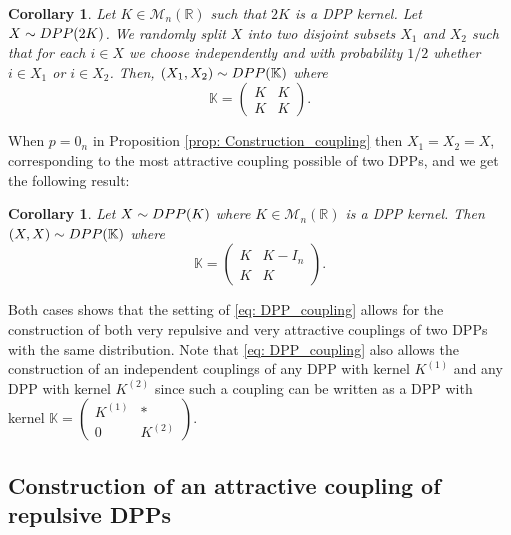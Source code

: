 \documentclass{article}
\numberwithin{equation}{section}
\newcommand{\bK}{\mathbb{K}}
\newcommand{\bR}{\mathbb{R}}
\newcommand{\DPP}{\textnormal{DPP}}
\theoremstyle{plain}
\newtheorem{corollary}[proposition]{Corollary}
\begin{document}
\begin{corollary} \label{prop: Ex_exclusion}
Let $K\in\mathcal{M}_n(\bR)$ such that $2K$ is a DPP kernel. Let $X\sim \DPP(2K)$. We randomly split $X$ into two disjoint subsets $X_1$ and $X_2$ such that for each $i\in X$ we choose independently and with probability $1/2$ whether $i\in X_1$ or $i\in X_2$. Then, $(X_1, X_2)\sim \DPP(\mathbb{K})$ where
\[\mathbb{K}=\begin{pmatrix} K & K \\
K & K
\end{pmatrix}.\]
\end{corollary}

\noindent When $p=0_n$ in Proposition \ref{prop: Construction_coupling} then $X_1=X_2=X$, corresponding to the most attractive coupling possible of two DPPs, and we get the following result:

\begin{corollary}\label{prop: identical_coupling}
Let $X\sim\DPP(K)$ where $K\in\mathcal{M}_n(\bR)$ is a DPP kernel. Then $(X, X)\sim\DPP(\bK)$ where
\[\bK=\begin{pmatrix} K & K - I_n \\
K & K
\end{pmatrix}.\]
\end{corollary}

\noindent Both cases shows that the setting of \eqref{eq: DPP_coupling} allows for the construction of both very repulsive and very attractive couplings of two DPPs with the same distribution. Note that \eqref{eq: DPP_coupling} also allows the construction of an independent couplings of any DPP with kernel $K^{(1)}$ and any DPP with kernel $K^{(2)}$ since such a coupling can be written as a DPP with kernel $\mathbb{K}=\begin{pmatrix} K^{(1)} & * \\
0 & K^{(2)}\end{pmatrix}$.

\subsection{Construction of an attractive coupling of repulsive DPPs}
\end{document}
